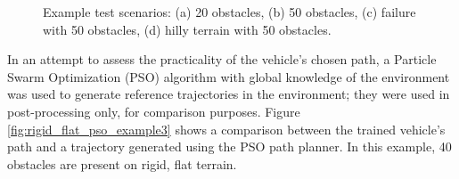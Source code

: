 \begin{figure}[h]
\begin{subfigure}{0.24\textwidth}
        \caption{}
        \label{fig:rigid_height_map_example13}
    \end{subfigure}
    \caption{Example test scenarios: (a) 20 obstacles, (b) 50 obstacles, (c) failure with 50 obstacles, (d) hilly terrain with 50 obstacles.}
    \label{fig:example_paths}
\end{figure}

In an attempt to assess the practicality of the vehicle's chosen path, a Particle Swarm Optimization (PSO) algorithm \cite{PSOObstacleAvoidance} with global knowledge of the environment was used to generate reference trajectories in the environment; they were used in post-processing only, for comparison purposes. Figure \ref{fig:rigid_flat_pso_example3} shows a comparison between the trained vehicle's path and a trajectory generated using the PSO path planner. In this example, 40 obstacles are present on rigid, flat terrain. %

